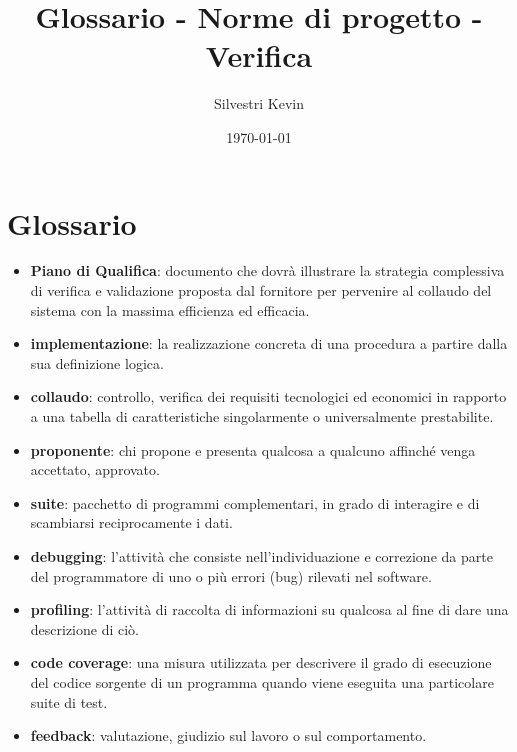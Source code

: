 \documentclass[openany,12pt,a4paper]{report}
\title{Glossario - Norme di progetto - Verifica}
\author{Silvestri Kevin}
\date{\today}
\begin{document}
\chapter{Glossario}

\begin{itemize}
    \item \textbf{Piano di Qualifica}: documento che dovrà illustrare la strategia complessiva di verifica e validazione proposta dal fornitore per pervenire al collaudo del sistema con la massima efficienza ed efficacia.
    \item \textbf{implementazione}: la realizzazione concreta di una procedura a partire dalla sua definizione logica.
    \item \textbf{collaudo}: controllo, verifica dei requisiti tecnologici ed economici in rapporto a una tabella di caratteristiche singolarmente o universalmente prestabilite.
    \item \textbf{proponente}: chi propone e presenta qualcosa a qualcuno affinché venga accettato, approvato.
    \item \textbf{suite}: pacchetto di programmi complementari, in grado di interagire e di scambiarsi reciprocamente i dati.
    \item \textbf{debugging}: l'attività che consiste nell'individuazione e correzione da parte del programmatore di uno o più errori (bug) rilevati nel software.
    \item \textbf{profiling}: l'attività di raccolta di informazioni su qualcosa al fine di dare una descrizione di ciò.
    \item \textbf{code coverage}: una misura utilizzata per descrivere il grado di esecuzione del codice sorgente di un programma quando viene eseguita una particolare suite di test.
    \item \textbf{feedback}: valutazione, giudizio sul lavoro o sul comportamento.
\end{itemize}
\end{document}
